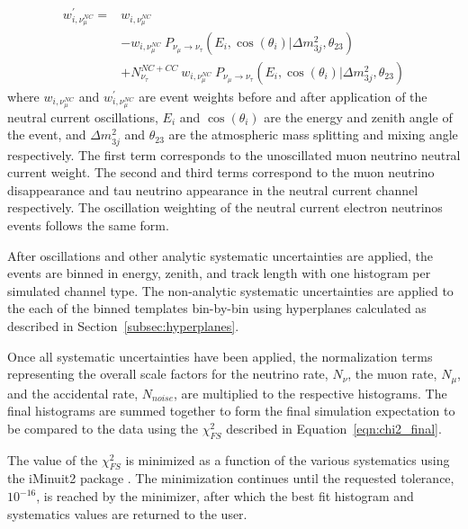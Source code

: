 \begin{equation}
\begin{aligned}
	w_{i, \nu_\mu^{NC}}^\prime ={}& w_{i, \nu_\mu^{NC}}  \\ 
													{}&- w_{i, \nu_\mu^{NC}}\ P_{\nu_\mu\rightarrow\nu_\tau}\left(E_i, \cos(\theta_i) \vert \Delta m^2_{3j}, \theta_{23} \right) \\ 
													{}&+ N^{NC+CC}_{\nu_\tau}\ w_{i, \nu_\mu^{NC}}\ P_{\nu_\mu\rightarrow\nu_\tau}\left(E_i, \cos(\theta_i) \vert \Delta m^2_{3j}, \theta_{23} \right) 
\end{aligned}
\end{equation}
%
where $w_{i, \nu_\mu^{NC}}$ and $w_{i, \nu_\mu^{NC}}^\prime$ are event weights before and after application of the neutral current oscillations, $E_i$ and $\cos(\theta_i)$ are the energy and zenith angle of the event, and $\Delta m^2_{3j}$ and $\theta_{23}$ are the atmospheric mass splitting and mixing angle respectively.
The first term corresponds to the unoscillated muon neutrino neutral current weight.
The second and third terms correspond to the muon neutrino disappearance and tau neutrino appearance in the neutral current channel respectively.
The oscillation weighting of the neutral current electron neutrinos events follows the same form.

After oscillations and other analytic systematic uncertainties are applied, the events are binned in energy, zenith, and track length with one histogram per simulated channel type.
The non-analytic systematic uncertainties are applied to the each of the binned templates bin-by-bin using hyperplanes calculated as described in Section~\ref{subsec:hyperplanes}.

Once all systematic uncertainties have been applied, the normalization terms representing the overall scale factors for the neutrino rate, $N_\nu$, the muon rate, $N_\mu$, and the accidental rate, $N_{noise}$, are multiplied to the respective histograms.
The final histograms are summed together to form the final simulation expectation to be compared to the data using the $\chi^2_{FS}$ described in Equation~\ref{eqn:chi2_final}.

The value of the $\chi^2_{FS}$ is minimized as a function of the various systematics using the iMinuit2 package \cite{iminuit-paper,iminuit-code}.
The minimization continues until the requested tolerance, $10^{-16}$, is reached by the minimizer, after which the best fit histogram and systematics values are returned to the user.








